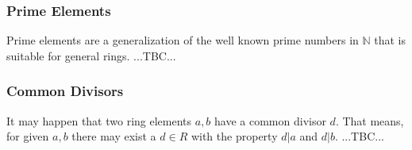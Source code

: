 
\subsubsection{Prime Elements}
Prime elements are a generalization of the well known prime numbers in $\mathbb{N}$ that is suitable for general rings. ...TBC...




\subsubsection{Common Divisors}
It may happen that two ring elements $a,b$ have a common divisor $d$. That means, for given $a,b$ there may exist a $d \in R$ with the property $d | a$ and $d | b$. ...TBC...


